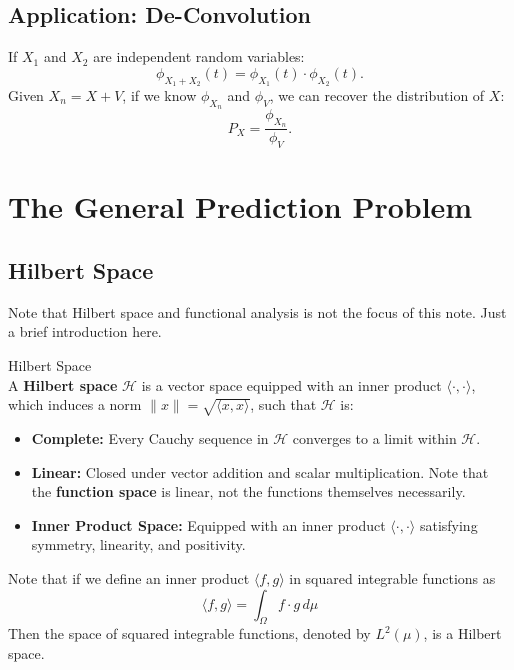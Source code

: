 \begin{prf}
\subsection{Application: De-Convolution}
\noindent If $X_1$ and $X_2$ are independent random variables:
\[
\phi_{X_1 + X_2}(t) = \phi_{X_1}(t) \cdot \phi_{X_2}(t).
\]
Given $X_n = X + V$, if we know $\phi_{X_n}$ and $\phi_V$, we can recover the distribution of $X$:
\[
P_X = \frac{\phi_{X_n}}{\phi_V}.
\]


\newpage
\section{The General Prediction Problem}
\subsection{Hilbert Space}
Note that Hilbert space and functional analysis is not the focus of this note. Just a brief introduction here. 

\begin{df}{Hilbert Space}\\
A \textbf{Hilbert space} $\mathscr{H}$ is a vector space equipped with an inner product $\langle \cdot, \cdot \rangle$, which induces a norm $\| x \| = \sqrt{\langle x, x \rangle}$, such that $\mathscr{H}$ is:
\begin{itemize}
    \item \textbf{Complete:} Every Cauchy sequence in $\mathscr{H}$ converges to a limit within $\mathscr{H}$.
    \item \textbf{Linear:} Closed under vector addition and scalar multiplication. Note that the \textbf{function space} is linear, not the functions themselves necessarily. 
    \item \textbf{Inner Product Space:} Equipped with an inner product $\langle \cdot, \cdot \rangle$ satisfying symmetry, linearity, and positivity.
\end{itemize}
Note that if we define an inner product $\langle f, g \rangle$ in squared integrable functions as 
$$\langle f, g \rangle = \int_\Omega f\cdot g\, d\mu$$
Then the space of squared integrable functions, denoted by $L^2(\mu)$, is a Hilbert space. 
\end{df}



\end{prf}

